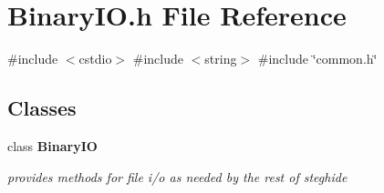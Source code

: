 \section{Binary\+I\+O.\+h File Reference}
\label{BinaryIO_8h}
{\ttfamily \#include $<$cstdio$>$}\newline
{\ttfamily \#include $<$string$>$}\newline
{\ttfamily \#include \char`\"{}common.\+h\char`\"{}}\newline
\subsection*{Classes}
\begin{DoxyCompactItemize}
\item 
class \textbf{ Binary\+IO}
\begin{DoxyCompactList}\small\item\em provides methods for file i/o as needed by the rest of steghide \end{DoxyCompactList}\end{DoxyCompactItemize}
